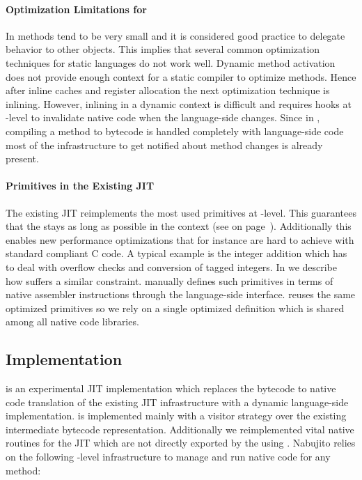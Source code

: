 \paragraph{Optimization Limitations for \PH}
In \ST methods tend to be very small and it is considered good practice to delegate behavior to other objects.
This implies that several common optimization techniques for static languages do not work well.
Dynamic method activation does not provide enough context for a static compiler to optimize methods.
Hence after inline caches and register allocation the next optimization technique is inlining.
However, inlining in a dynamic context is difficult and requires hooks at \VM-level to invalidate native code when the language-side changes.
Since in \PH, compiling a method to bytecode is handled completely with language-side code most of the infrastructure to get notified about method changes is already present.

\paragraph{Primitives in the Existing JIT}
The existing JIT reimplements the most used primitives at \VM-level.
This guarantees that the \VM stays as long as possible in the \JIT context (see  on page~\pageref{sec:benzo-jit-interaction}).
Additionally this enables new performance optimizations that for instance are hard to achieve with standard compliant C code.
A typical example is the integer addition which has to deal with overflow checks and conversion of tagged integers.
In  we describe how \WF suffers a similar constraint.
\WF manually defines such primitives in terms of native assembler instructions through the language-side \B interface.
\NBJ reuses the same optimized primitives so we rely on a single optimized definition which is shared among all native code libraries.

\subsection{Implementation}
\NBJ is an experimental JIT implementation which replaces the bytecode to native code translation of the existing JIT infrastructure with a dynamic language-side implementation.
\NBJ is implemented mainly with a visitor strategy over the existing intermediate bytecode representation. 
Additionally we reimplemented vital native routines for the JIT which are not directly exported by the \VM using \B. 
Nabujito relies on the following \VM-level infrastructure to manage and run native code for any \PH method:

